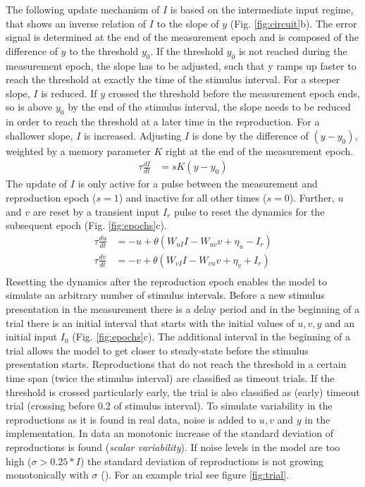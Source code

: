 \documentclass[9pt]{article}
\begin{document}
The following update mechanism of $I$ is based on the intermediate input regime, that shows an inverse relation of $I$ to the slope of $y$ (Fig. \ref{fig:circuit}b).
The error signal is determined at the end of the measurement epoch and is composed of the difference of $y$ to the threshold $y_0$.
If the threshold $y_0$ is not reached during the measurement epoch, the slope has to be adjusted, such that y ramps up faster to reach the threshold at exactly the time of the stimulus interval. For a steeper slope, $I$ is reduced.
If $y$ crossed the threshold before the measurement epoch ends, so is above $y_0$ by the end of the stimulus interval, the slope needs to be reduced in order to reach the threshold at a later time in the reproduction. For a shallower slope, $I$ is increased.
Adjusting $I$ is done by the difference of $(y-y_0)$, weighted by a memory parameter $K$ right at the end of the measurement epoch.
\begin{equation} \label{Iupdate}
	\begin{split}
	\tau\frac{dI}{dt} & = sK(y-y_0)
	\end{split}
\end{equation}
The update of $I$ is only active for a pulse between the measurement and reproduction epoch ($s=1$) and inactive for all other times ($s=0$).
Further, $u$ and $v$ are reset by a transient input $I_r$ pulse to reset the dynamics for the subsequent epoch (Fig. \ref{fig:epochs}c).
\begin{equation} \label{experimentcircuit}
	\begin{split}
	\tau\frac{du}{dt} & = -u + \theta(W_{uI}I - W_{uv}v + \eta_u - I_r) \\
	\tau\frac{dv}{dt} & = -v + \theta(W_{vI}I - W_{vu}v + \eta_v + I_r) \\
	\end{split}
\end{equation}
Resetting the dynamics after the reproduction epoch enables the model to simulate an arbitrary number of stimulus intervals. 
Before a new stimulus presentation in the measurement there is a delay period and in the beginning of a trial there is an initial interval that starts with the initial values of $u, v, y$ and an initial input $I_0$ (Fig. \ref{fig:epochs}c). 
The additional interval in the beginning of a trial allows the model to get closer to steady-state before the stimulus presentation starts. 
Reproductions that do not reach the threshold in a certain time span (twice the stimulus interval) are classified as timeout trials. 
If the threshold is crossed particularly early, the trial is also classified as (early) timeout trial (crossing before 0.2 of stimulus interval).
To simulate variability in the reproductions as it is found in real data, noise is added to $u, v$ and $y$ in the implementation. In data an monotonic increase of the standard deviation of reproductions is found (\textit{scalar variability}). 
If noise levels in the model are too high ($\sigma>0.25*I$) the standard deviation of reproductions is not growing monotonically with $\sigma$ (\cite{Egger2020}). 
For an example trial see figure \ref{fig:trial}. 
\end{document}
